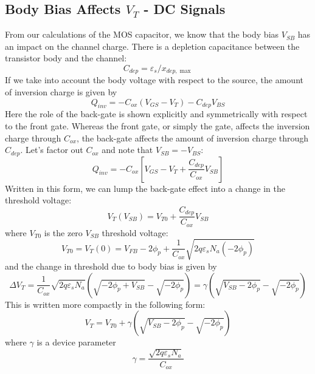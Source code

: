 \subsection{Body Bias Affects $V_T$ - DC Signals}
From our calculations of the MOS capacitor, we know that the body bias $V_{SB}$ has an impact on the channel charge.  There is a depletion capacitance between the transistor body and the channel:
\begin{equation}
	{C_{dep}} = {\varepsilon _s}/{x_{dep,\max }}
\end{equation}
If we take into account the body voltage with respect to the source, the amount of inversion charge is given by
\begin{equation}
	{Q_{inv}} =  - {C_{ox}}({V_{GS}} - {V_T}) - {C_{dep}}{V_{BS}}
\end{equation}
Here the role of the back-gate is shown explicitly and symmetrically with respect to the front gate.  Whereas the front gate, or simply the gate, affects the inversion charge through $C_{ox}$, the back-gate affects the amount of inversion charge through $C_{dep}$.  
%
Let's factor out $C_{ox}$ and note that $V_{SB} = - V_{BS}$:
\begin{equation}
	{Q_{inv}} =  - {C_{ox}}\left[ {{V_{GS}} - {V_T} + \frac{{{C_{dep}}}}{{{C_{ox}}}}{V_{SB}}} \right]
\end{equation}
Written in this form, we can lump the back-gate effect into a change in the threshold voltage:
\begin{equation}
	{V_T}({V_{SB}}) = {V_{T0}} + \frac{{{C_{dep}}}}{{{C_{ox}}}}{V_{SB}}
\end{equation}
where $V_{T0}$ is the zero $V_{SB}$ threshold voltage:
\begin{equation}
{V_{T0}} = {V_T}(0) = {V_{FB}} - 2{\phi _p} + \frac{1}{{{C_{ox}}}}\sqrt {2q{\varepsilon _s}{N_a}( - 2{\phi _p})} 
\end{equation}
and the change in threshold due to body bias is given by
\begin{equation}
	\Delta {V_T} = \frac{1}{{{C_{ox}}}}\sqrt {2q{\varepsilon _s}{N_a}} \left(\sqrt { - 2{\phi _p} + {V_{SB}}}  - \sqrt { - 2{\phi _p}} \right) = \gamma \left( {\sqrt {{V_{SB}} - 2{\phi _p}}  - \sqrt { - 2{\phi _p}} } \right)
\end{equation}
This is written more compactly in the following form:
\begin{equation}
	{V_T} = {V_{T0}} + \gamma \left( {\sqrt {{V_{SB}} - 2{\phi _p}}  - \sqrt { - 2{\phi _p}} } \right)
	\label{eq:vtbias}
\end{equation}
where $\gamma$ is a device parameter
\begin{equation}
	\gamma = \frac{\sqrt{2q\varepsilon_s N_a}}{C_{ox}}
\end{equation}

